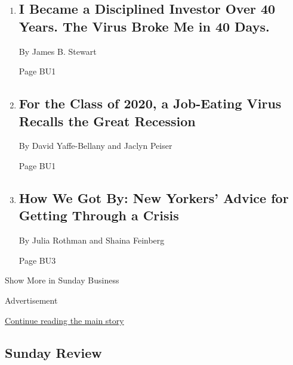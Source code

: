 \begin{enumerate}
\def\labelenumi{\arabic{enumi}.}
\item
  \href{/2020/03/27/business/stock-market-pandemic-coronavirus.html}{}

  \hypertarget{i-became-a-disciplined-investor-over-40-years-the-virus-broke-me-in-40-days-1}{%
  \subsection{I Became a Disciplined Investor Over 40 Years. The Virus
  Broke Me in 40
  Days.}\label{i-became-a-disciplined-investor-over-40-years-the-virus-broke-me-in-40-days-1}}

  By James B. Stewart

  Page BU1
\item
  \href{/2020/03/27/business/coronavirus-class-of-2020-jobs.html}{}

  \hypertarget{for-the-class-of-2020-a-job-eating-virus-recalls-the-great-recession-1}{%
  \subsection{For the Class of 2020, a Job-Eating Virus Recalls the
  Great
  Recession}\label{for-the-class-of-2020-a-job-eating-virus-recalls-the-great-recession-1}}

  By David Yaffe-Bellany and Jaclyn Peiser

  Page BU1
\item
  \href{/2020/03/26/business/how-to-cope-coronavirus.html}{}

  \hypertarget{how-we-got-by-new-yorkers-advice-for-getting-through-a-crisis}{%
  \subsection{How We Got By: New Yorkers' Advice for Getting Through a
  Crisis}\label{how-we-got-by-new-yorkers-advice-for-getting-through-a-crisis}}

  By Julia Rothman and Shaina Feinberg

  Page BU3
\end{enumerate}

Show More in Sunday Business

Advertisement

\protect\hyperlink{after-mid4}{Continue reading the main story}

\hypertarget{sunday-review}{%
\subsection{Sunday Review}\label{sunday-review}}

